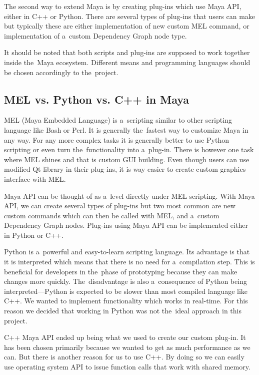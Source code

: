 \documentclass[
  digital, %
  table,   %
  nolof,     %
  nolot,     %
  oneside,
]{fithesis3}
\begin{document}
The second way to extend Maya is by creating plug-ins which use Maya API, either in C++ or Python. There are several types of plug-ins that users can make but typically these are either implementation of new custom MEL command, or implementation of a custom Dependency Graph node type.

It should be noted that both scripts and plug-ins are supposed to work together inside the Maya ecosystem. Different means and programming languages should be chosen accordingly to the project.

\subsection{MEL vs. Python vs. C++ in Maya}
MEL (Maya Embedded Language) is a scripting similar to other scripting language like Bash or Perl. It is generally the fastest way to customize Maya in any way. For any more complex tasks it is generally better to use Python scripting or even turn the functionality into a plug-in. There is however one task where MEL shines and that is custom GUI building. Even though users can use modified Qt library in their plug-ins, it is way easier to create custom graphics interface with MEL.

Maya API can be thought of as a level directly under MEL scripting. With Maya API, we can create several types of plug-ins but two most common are new custom commands which can then be called with MEL, and a custom Dependency Graph nodes. Plug-ins using Maya API can be implemented either in Python or C++.

Python is a powerful and easy-to-learn scripting language. Its advantage is that it is interpreted which means that there is no need for a compilation step. This is beneficial for developers in the phase of prototyping because they can make changes more quickly. The disadvantage is also a consequence of Python being interpreted—Python is expected to be slower than most compiled language like C++. We wanted to implement functionality which works in real-time. For this reason we decided that working in Python was not the ideal approach in this project.

C++ Maya API ended up being what we used to create our custom plug-in. It has been chosen primarily because we wanted to get as much performance as we can. But there is another reason for us to use C++. By doing so we can easily use operating system API to issue function calls that work with shared memory.
\end{document}
